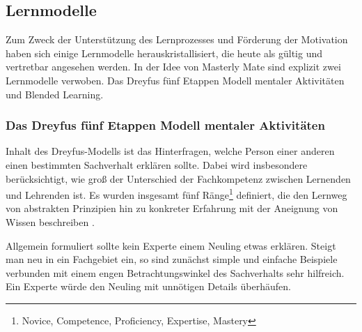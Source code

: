 \subsection{Lernmodelle}
Zum Zweck der Unterstützung des Lernprozesses und Förderung der Motivation haben
sich einige Lernmodelle herauskristallisiert, die heute als gültig und
vertretbar angesehen werden. In der Idee von Masterly Mate sind explizit zwei
Lernmodelle verwoben. Das Dreyfus fünf Etappen Modell mentaler Aktivitäten und
Blended Learning.

\subsubsection{Das Dreyfus fünf Etappen Modell mentaler
Aktivitäten}\label{ref:dreyfus}
Inhalt des Dreyfus-Modells ist das Hinterfragen, welche Person einer anderen
einen bestimmten Sachverhalt erklären sollte. Dabei wird insbesondere
berücksichtigt, wie groß der Unterschied der Fachkompetenz zwischen Lernenden
und Lehrenden ist. Es wurden insgesamt fünf Ränge\footnote{Novice, Competence,
Proficiency, Expertise, Mastery} definiert, die den Lernweg von abstrakten
Prinzipien hin zu konkreter Erfahrung mit der Aneignung von Wissen beschreiben
\cite{dreyfus:1980}.

Allgemein formuliert sollte kein Experte einem Neuling etwas erklären. Steigt
man neu in ein Fachgebiet ein, so sind zunächst simple und einfache Beispiele
verbunden mit einem engen Betrachtungswinkel des Sachverhalts sehr hilfreich.
Ein Experte würde den Neuling mit unnötigen Details überhäufen.

